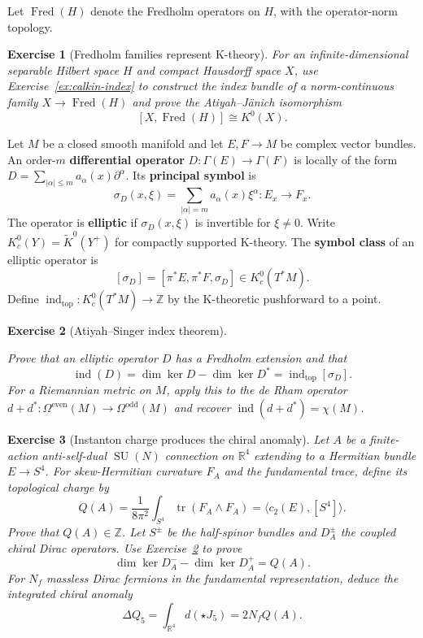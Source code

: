 \documentclass{article}
\newtheorem{exercise}{Exercise}
\begin{document}
Let $\operatorname{Fred}(H)$ denote the Fredholm operators on $H$, with the
operator-norm topology.

\begin{exercise}[Fredholm families represent K-theory]\leavevmode\par
\textit{For an infinite-dimensional separable Hilbert space $H$ and compact
Hausdorff space $X$, use Exercise~\ref{ex:calkin-index} to construct the index
bundle of a norm-continuous family $X\to\operatorname{Fred}(H)$ and prove the
Atiyah--J\"anich isomorphism}
\cite{atiyah-k-theory}
\[
[X,\operatorname{Fred}(H)]\cong K^0(X).
\]
\end{exercise}

Let $M$ be a closed smooth manifold and let $E,F\to M$ be complex vector
bundles. An order-$m$ \textbf{differential operator}
$D:\Gamma(E)\to\Gamma(F)$ is locally of the form
$D=\sum_{|\alpha|\leq m}a_\alpha(x)\partial^\alpha$. Its \textbf{principal
symbol} is
\[
\sigma_D(x,\xi)=\sum_{|\alpha|=m}a_\alpha(x)\xi^\alpha:
E_x\longrightarrow F_x.
\]
The operator is \textbf{elliptic} if $\sigma_D(x,\xi)$ is invertible for
$\xi\ne0$. Write $K_c^0(Y)=\widetilde K^0(Y^+)$ for compactly supported
K-theory. The \textbf{symbol class} of an elliptic operator is
\[
[\sigma_D]=[\pi^*E,\pi^*F,\sigma_D]\in K_c^0(T^*M).
\]
Define $\operatorname{ind}_{\mathrm{top}}:K_c^0(T^*M)\to\mathbb Z$ by the
K-theoretic pushforward to a point.

\begin{exercise}[Atiyah--Singer index theorem]
\label{ex:atiyah-singer}\leavevmode\par
\textit{Prove that an elliptic operator $D$ has a Fredholm extension and that}
\cite{atiyah-singer-index}
\[
\operatorname{ind}(D)
=\dim\ker D-\dim\ker D^*
=\operatorname{ind}_{\mathrm{top}}[\sigma_D].
\]
\textit{For a Riemannian metric on $M$, apply this to the de Rham operator
$d+d^*:\Omega^{\mathrm{even}}(M)\to\Omega^{\mathrm{odd}}(M)$ and recover
$\operatorname{ind}(d+d^*)=\chi(M)$.}
\end{exercise}

\begin{exercise}[Instanton charge produces the chiral anomaly]\leavevmode\par
\textit{Let $A$ be a finite-action anti-self-dual $\operatorname{SU}(N)$
connection on $\mathbb R^4$ extending to a Hermitian bundle $E\to S^4$.
For skew-Hermitian curvature $F_A$ and the fundamental trace, define its
topological charge by}
\[
Q(A)=\frac{1}{8\pi^2}\int_{S^4}\operatorname{tr}(F_A\wedge F_A)
=\langle c_2(E),[S^4]\rangle.
\]
\textit{Prove that $Q(A)\in\mathbb Z$. Let $S^\pm$ be the half-spinor bundles
and $D_A^\pm$ the coupled chiral Dirac operators. Use
Exercise~\ref{ex:atiyah-singer} to prove}
\[
\dim\ker D_A^- - \dim\ker D_A^+=Q(A).
\]
\textit{For $N_f$ massless Dirac fermions in the fundamental representation,
deduce the integrated chiral anomaly}
\cite{fujikawa-anomaly}
\[
\Delta Q_5=\int_{\mathbb R^4}d(\star J_5)=2N_fQ(A).
\]
\end{exercise}
\end{document}
